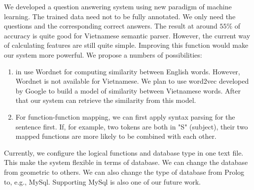 \label{sec:conclusion}
We developed a question answering system using new paradigm of machine learning. The trained data need not to be fully annotated. We only need the questions and the corresponding correct answers. The result at around $55\%$ of accuracy is quite good for Vietnamese semantic parser. However, the current way of calculating features are still quite simple. Improving this function would make our system more powerful. We propose a numbers of possibilities:
\begin{enumerate}
  \item \citeauthor{Clarke:2010:DSP:1870568.1870571} in \cite{Clarke:2010:DSP:1870568.1870571} use Wordnet for computing similarity between English words. However, Wordnet is not available for Vietnamese. We plan to use word2vec developed by Google to build a model of similarity between Vietnamese words. After that our system can retrieve the similarity from this model.
  \item For function-function mapping, we can first apply syntax parsing for the sentence first. If, for example, two tokens are both in "S" (subject), their two mapped functions are more likely to be combined with each other. 
\end{enumerate} 

Currently, we configure the logical functions and database type in one text file. This make the system flexible in terms of database. We can change the database from geometric to others. We can also change the type of database from Prolog to, e.g., MySql. Supporting MySql is also one of our future work.
